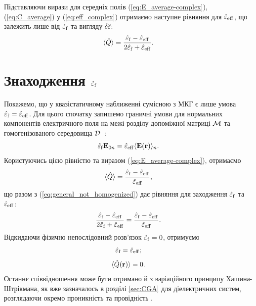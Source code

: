 \documentclass[14pt,twoside]{vakthesis}
\begin{document}
Підставляючи вирази для середніх полів (\ref{eq:E_average-complex}), 
(\ref{eq:C_average}) у (\ref{eq:eff_complex}) отримаємо наступне 
рівняння для $\hat{\varepsilon}_{\rm eff}$, що залежить лише від 
$\hat{\varepsilon}_{\rm f}$ та вигляду $\delta\hat{\varepsilon}$:
\begin{equation}\label{eq:general_not_homogenized}
\langle \hat{Q} \rangle = \frac{\hat{\varepsilon}_{\rm f} - \hat{\varepsilon}_{\rm eff}}{2\hat{\varepsilon}_{\rm f} + \hat{\varepsilon}_{\rm eff}}.
\end{equation}


\section{Знаходження $\hat{\varepsilon}_{\rm f}$}\label{sec:eps-f}

Покажемо, що у квазістатичному наближенні сумісною з МКГ є лише умова $\hat{\varepsilon}_{\rm f} = \hat{\varepsilon}_{\rm eff}$.
Для цього спочатку запишемо граничні умови для нормальних компонентів електричного поля на межі розділу допоміжної матриці $\cal{M}$ та гомогенізованого середовища $\cal D$~\cite{Sillars1937}:
\begin{equation}\label{eq:boundary}
\hat{\varepsilon}_{\rm f} {\bf E}_{0n} = \hat{\varepsilon}_{\rm eff} \langle {\bf E}({\bf r}) \rangle_{n}.
\end{equation}
Користуючись цією рівністю та виразом (\ref{eq:E_average-complex}), отримаємо 
\begin{equation}\label{eq:system_for_homog}
\langle \hat{Q} \rangle = \frac{\hat{\varepsilon}_{\rm f} - \hat{\varepsilon}_{\rm eff}}{\hat{\varepsilon}_{\rm eff}},
\end{equation}
що разом з (\ref{eq:general_not_homogenized}) дає рівняння для
заходження $\hat{\varepsilon}_{\rm f}$ та $\hat{\varepsilon}_{\rm eff}$:
\begin{equation}
	\frac{\hat{\varepsilon}_{\rm f} - \hat{\varepsilon}_{\rm eff}}{2\hat{\varepsilon}_{\rm f} + \hat{\varepsilon}_{\rm eff}} = \frac{\hat{\varepsilon}_{\rm f} - \hat{\varepsilon}_{\rm eff}}{\hat{\varepsilon}_{\rm eff}}.
\end{equation}
Відкидаючи фізично непослідовний розв'язок 
$\hat{\varepsilon}_{\rm f} = 0$, отримуємо
\begin{equation}\label{eq:homog}
\hat{\varepsilon}_{\rm f} = \hat{\varepsilon}_{\rm eff};
\end{equation}
\begin{equation}\label{eq:general_Q}
\langle \hat{Q} ({\bf r}) \rangle = 0.
\end{equation}
Останнє співвідношення може бути отримано й з варіаційного принципу Ха\-шина-Штрік\-мана, як вже зазначалось в розділі \ref{sec:CGA} для діелектричних систем, розглядаючи окремо проникність та провідність \cite{Sushko2017, Torquato1991}.
\end{document}
